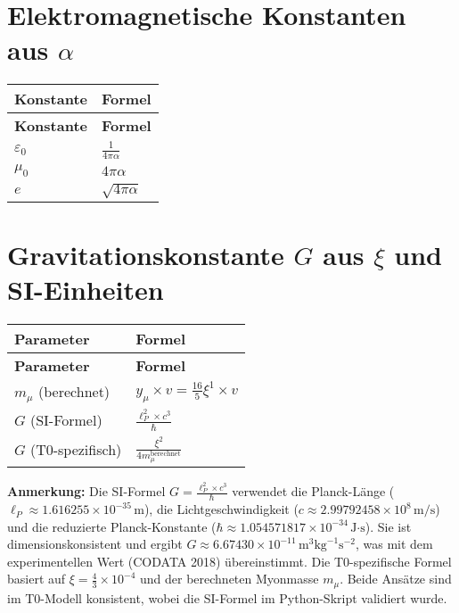 \documentclass[12pt,a4paper]{article}
\begin{document}
	\section{Elektromagnetische Konstanten aus \(\alpha\)}
	
	\begin{longtable}{|p{3cm}|p{4cm}|}
		\hline
		\textbf{Konstante} & \textbf{Formel} \\
		\hline
		\endfirsthead
		\hline
		\textbf{Konstante} & \textbf{Formel} \\
		\hline
		\endhead
		\(\varepsilon_0\) & \(\frac{1}{4\pi\alpha}\) \\
		\hline
		\(\mu_0\) & \(4\pi\alpha\) \\
		\hline
		\(e\) & \(\sqrt{4\pi\alpha}\) \\
		\hline
	\end{longtable}
	
	\section{Gravitationskonstante \( G \) aus \(\xi\) und SI-Einheiten}
	
	\begin{longtable}{|p{3cm}|p{5cm}|}
		\hline
		\textbf{Parameter} & \textbf{Formel} \\
		\hline
		\endfirsthead
		\hline
		\textbf{Parameter} & \textbf{Formel} \\
		\hline
		\endhead
		\(m_{\mu}\) (berechnet) & \(y_{\mu} \times v = \frac{16}{5}\xi^{1} \times v\) \\
		\hline
		\(G\) (SI-Formel) & \(\frac{\ell_P^2 \times c^3}{\hbar}\) \\
		\hline
		\(G\) (T0-spezifisch) & \(\frac{\xi^{2}}{4m_{\mu}^{\text{berechnet}}}\) \\
		\hline
	\end{longtable}
	
	\textbf{Anmerkung:} Die SI-Formel \( G = \frac{\ell_P^2 \times c^3}{\hbar} \) verwendet die Planck-Länge (\(\ell_P \approx 1.616255 \times 10^{-35} \, \text{m}\)), die Lichtgeschwindigkeit (\(c \approx 2.99792458 \times 10^8 \, \text{m/s}\)) und die reduzierte Planck-Konstante (\(\hbar \approx 1.054571817 \times 10^{-34} \, \text{J·s}\)). Sie ist dimensionskonsistent und ergibt \( G \approx 6.67430 \times 10^{-11} \, \text{m}^3 \text{kg}^{-1} \text{s}^{-2} \), was mit dem experimentellen Wert (CODATA 2018) übereinstimmt. Die T0-spezifische Formel basiert auf \(\xi = \frac{4}{3} \times 10^{-4}\) und der berechneten Myonmasse \( m_\mu \). Beide Ansätze sind im T0-Modell konsistent, wobei die SI-Formel im Python-Skript validiert wurde.
	
\end{document}
